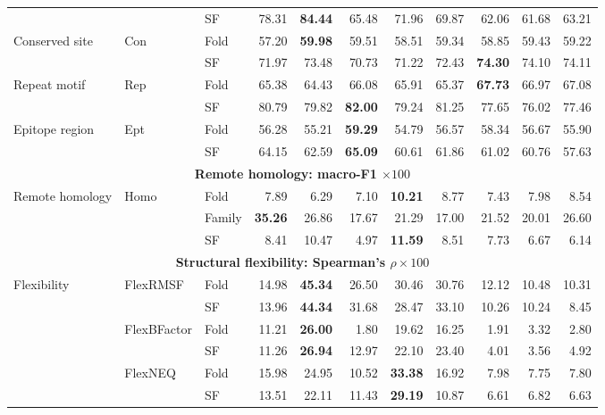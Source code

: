 \begin{table}[H]
{\begin{tabular}{@{}lllrrrrrrrr@{}}
 &  & SF & 78.31 & \textbf{84.44} & 65.48 & 71.96 & 69.87 & 62.06 & 61.68 & 63.21 \\
\multirow{2}{*}{Conserved site} & \multirow{2}{*}{Con} & Fold & 57.20 & \textbf{59.98} & 59.51 & 58.51 & 59.34 & 58.85 & 59.43 & 59.22 \\
 &  & SF & 71.97 & 73.48 & 70.73 & 71.22 & 72.43 & \textbf{74.30} & 74.10 & 74.11 \\
\multirow{2}{*}{Repeat motif} & \multirow{2}{*}{Rep} & Fold & 65.38 & 64.43 & 66.08 & 65.91 & 65.37 & \textbf{67.73} & 66.97 & 67.08 \\
 &  & SF & 80.79 & 79.82 & \textbf{82.00} & 79.24 & 81.25 & 77.65 & 76.02 & 77.46 \\
\multirow{2}{*}{Epitope region} & \multirow{2}{*}{Ept} & Fold & 56.28 & 55.21 & \textbf{59.29} & 54.79 & 56.57 & 58.34 & 56.67 & 55.90 \\
 &  & SF & 64.15 & 62.59 & \textbf{65.09} & 60.61 & 61.86 & 61.02 & 60.76 & 57.63 \\
\midrule
\multicolumn{11}{c}{\textbf{Remote homology: macro-F1 $\times100$}} \\
\midrule
\multirow{3}{*}{Remote homology} & \multirow{3}{*}{Homo} & Fold & 7.89 & 6.29 & 7.10 & \textbf{10.21} & 8.77 & 7.43 & 7.98 & 8.54 \\
 &  & Family & \textbf{35.26} & 26.86 & 17.67 & 21.29 & 17.00 & 21.52 & 20.01 & 26.60 \\
 &  & SF & 8.41 & 10.47 & 4.97 & \textbf{11.59} & 8.51 & 7.73 & 6.67 & 6.14 \\
\midrule
\multicolumn{11}{c}{\textbf{Structural flexibility: Spearman's $\rho\times100$}} \\
\midrule
\multirow{6}{*}{Flexibility} & \multirow{2}{*}{FlexRMSF} & Fold & 14.98 & \textbf{45.34} & 26.50 & 30.46 & 30.76 & 12.12 & 10.48 & 10.31 \\
 &  & SF & 13.96 & \textbf{44.34} & 31.68 & 28.47 & 33.10 & 10.26 & 10.24 & 8.45 \\
 & \multirow{2}{*}{FlexBFactor} & Fold & 11.21 & \textbf{26.00} & 1.80 & 19.62 & 16.25 & 1.91 & 3.32 & 2.80 \\
 &  & SF & 11.26 & \textbf{26.94} & 12.97 & 22.10 & 23.40 & 4.01 & 3.56 & 4.92 \\
 & \multirow{2}{*}{FlexNEQ} & Fold & 15.98 & 24.95 & 10.52 & \textbf{33.38} & 16.92 & 7.98 & 7.75 & 7.80 \\
 &  & SF & 13.51 & 22.11 & 11.43 & \textbf{29.19} & 10.87 & 6.61 & 6.82 & 6.63 \\
\bottomrule
\end{tabular}%
}
\stbworkshopfit
\end{table}

\clearpage
\endgroup

